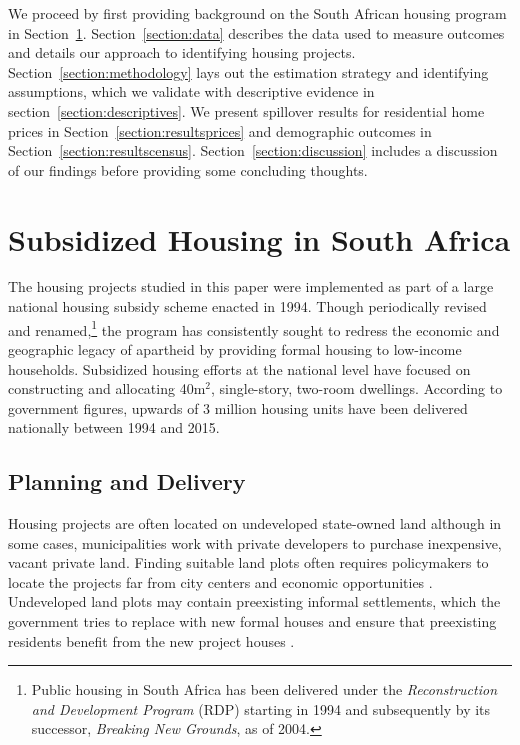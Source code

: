 \documentclass[12pt]{article}
\begin{document}
We proceed by first providing background on the South African housing program in Section~\ref{section:background}. 
Section~\ref{section:data} describes the data used to measure outcomes and details our approach to identifying housing projects. Section~\ref{section:methodology} lays out the estimation strategy and identifying assumptions, which we validate with descriptive evidence in section~\ref{section:descriptives}. We present spillover results for residential home prices in Section~\ref{section:resultsprices} and demographic outcomes in Section~\ref{section:resultscensus}.  Section~\ref{section:discussion} includes a discussion of our findings before providing some concluding thoughts.


\section{Subsidized Housing in South Africa} \label{section:background}

The housing projects studied in this paper were implemented as part of a large national housing subsidy scheme enacted in 1994. Though periodically revised and renamed,\footnote{Public housing in South Africa has been delivered under the {\it Reconstruction and Development Program} (RDP) starting in 1994 and subsequently by its successor, {\it Breaking New Grounds}, as of 2004.} the program has consistently sought to redress the economic and geographic legacy of apartheid by providing formal housing to low-income households. Subsidized housing efforts at the national level have focused on constructing and allocating 40m$^2$, single-story, two-room dwellings. According to government figures, upwards of 3 million housing units have been delivered nationally between 1994 and 2015.

\subsection{Planning and Delivery}

Housing projects are often located on undeveloped state-owned land although in some cases, municipalities work with private developers to purchase inexpensive, vacant private land.  Finding suitable land plots often requires policymakers to locate the projects far from city centers and economic opportunities \citep{dhsreports}.  Undeveloped land plots may contain preexisting informal settlements, which the government tries to replace with new formal houses and ensure that preexisting residents benefit from the new project houses \citep{serihistory}.
\end{document}

